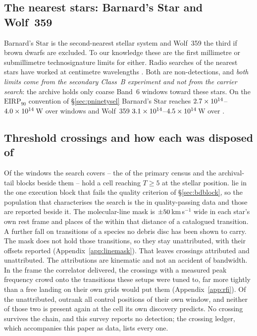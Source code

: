 \subsection{The nearest stars: Barnard's Star and Wolf~359}
\label{sec:barnardswolf}

Barnard's Star is the second-nearest stellar system and Wolf~359 the third if
brown dwarfs are excluded. To our knowledge these are the first millimetre
or submillimetre technosignature limits for either. Radio searches of the
nearest stars have worked at centimetre wavelengths
\citep{Enriquez2017,Price2020,Margot2023}. Both are non-detections, and
\emph{both limits come from the secondary Class~B experiment and not from the
carrier search}: the archive holds only coarse Band~6 windows toward these
stars. On the $\mathrm{EIRP}_{90}$ convention of \S\ref{sec:pninetysel}
Barnard's Star reaches $2.7\times10^{14}$--$4.0\times10^{14}$\,W over
\NWinBarn{} windows and Wolf~359 $3.1\times10^{14}$--$4.5\times10^{14}$\,W
over \NWinWolf.

\subsection{Threshold crossings and how each was disposed of}
\label{sec:technosearch}

Of the windows the search covers -- the \NWindows{} of the primary census and
the archival-tail blocks beside them -- \EvNCrossRaw{} hold a cell reaching
$T\geq5$ at the stellar position. \EvNCrossFlag{} lie in the one execution
block that fails the quality criterion of \S\ref{sec:bdblock}, so the
population that characterises the search is the \EvNCrossQp{} in
quality-passing data and those \EvNCrossFlag{} are reported beside it. The
molecular-line mask is $\pm50$\,km\,s$^{-1}$ wide in each star's own
rest frame and places \MkNCoinc{} of the \EvNCrossQp{} within that distance of
a catalogued transition. A further \SoNCrossWord{} fall on transitions of a
species no debris disc has been shown to carry. The mask does not hold those
transitions, so they stay unattributed, with their offsets reported
(Appendix~\ref{app:linemask}). That leaves \EvNAttrQp{} crossings attributed
and \EvNUnattrQp{} unattributed. The attributions are kinematic and not an
accident of bandwidth. In the frame the correlator delivered, the crossings
with a measured peak frequency crowd onto the transitions these setups were
tuned to, far more tightly than a free landing on their own grids would put them
(Appendix~\ref{app:rfi}). Of the unattributed, \EvNRankQp{} outrank all
\NCtrl{} control positions of their own window, and neither of those two is
present again at the cell its own discovery predicts. No crossing survives the chain, and this
survey reports no detection; the crossing ledger, which accompanies this paper
as data, lists every one.


